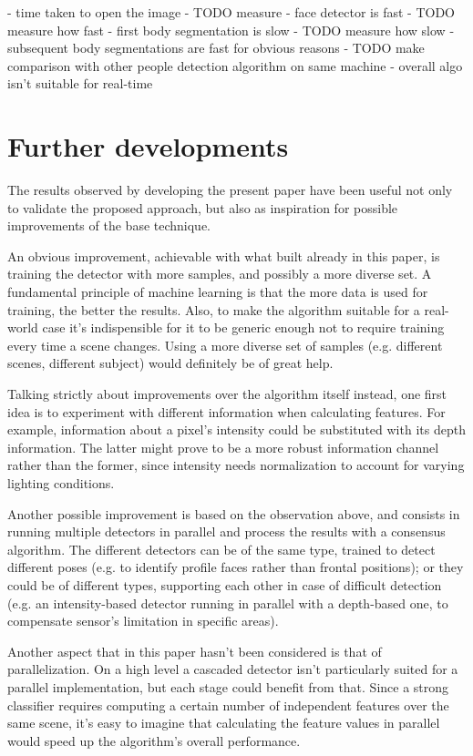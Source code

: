 \documentclass[a4paper,11pt,titlepage]{article}
\begin{document}
- time taken to open the image - TODO measure
- face detector is fast - TODO measure how fast
- first body segmentation is slow - TODO measure how slow
- subsequent body segmentations are fast for obvious reasons
- TODO make comparison with other people detection algorithm on same machine
- overall algo isn't suitable for real-time

\section{Further developments}
The results observed by developing the present paper have been useful not only to
validate the proposed approach, but also as inspiration for possible
improvements of the base technique.

An obvious improvement, achievable with what built already in this paper, is
training the detector with more samples, and possibly a more diverse set. A
fundamental principle of machine learning is that the more data is used for
training, the better the results. Also, to make the algorithm suitable for a
real-world case it's indispensible for it to be generic enough not to require
training every time a scene changes. Using a more diverse set of samples (e.g.
different scenes, different subject) would definitely be of great help.

Talking strictly about improvements over the algorithm itself instead, one first
idea is to experiment with different information when calculating features. For
example, information about a pixel's intensity could be substituted with its
depth information. The latter might prove to be a more robust information
channel rather than the former, since intensity needs normalization to account
for varying lighting conditions.

Another possible improvement is based on the observation above, and consists in
running multiple detectors in parallel and process the results with a consensus
algorithm. The different detectors can be of the same type, trained to detect
different poses (e.g. to identify profile faces rather than frontal positions);
or they could be of different types, supporting each other in case of difficult
detection (e.g. an intensity-based detector running in parallel with a
depth-based one, to compensate sensor's limitation in specific areas).

Another aspect that in this paper hasn't been considered is that of
parallelization. On a high level a cascaded detector isn't particularly suited
for a parallel implementation, but each stage could benefit from that. Since a
strong classifier requires computing a certain number of independent features
over the same scene, it's easy to imagine that calculating the feature values in
parallel would speed up the algorithm's overall performance.
\end{document}
